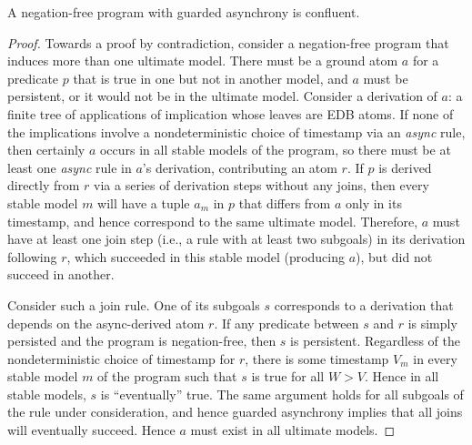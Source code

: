 \begin{lemma}
\label{lem:guarding}
A negation-free \lang program with guarded asynchrony is confluent.
\end{lemma}
\begin{proof}


Towards a proof by contradiction, consider a negation-free \lang program that 
induces more than one ultimate model.  There must be a ground atom $a$ for a predicate $p$
that is true in one but
not in another model, and $a$ must be persistent, or it would not be
in the ultimate model.  Consider a derivation of $a$: a finite tree of applications of
implication whose leaves are EDB atoms.  If none of the implications involve a nondeterministic
choice of timestamp via an {\em async} rule, then certainly 
$a$ occurs in all stable models of the program,
so there must be at least one {\em async} rule in $a$'s derivation, contributing an atom
$r$.  
If $p$ is derived directly from 
$r$ via a series of derivation steps without any joins, then every stable
model $m$ will have a tuple $a_m$ in $p$ that differs from $a$ only in its timestamp, 
and hence correspond to the same ultimate model.
Therefore, $a$ must have at least one join step (i.e., a rule with at least two subgoals)
in its derivation following $r$,
which succeeded in this stable model (producing $a$), but did not succeed in another.  

Consider such  a join rule.  One of its subgoals $s$ corresponds to a derivation that depends
on the async-derived atom $r$.  If any predicate between $s$ and $r$ is simply persisted and 
the program is negation-free,
then $s$ is persistent.  Regardless of the nondeterministic choice of timestamp for $r$, there
is some timestamp $V_m$ in every stable model $m$ of the program such that $s$ is true
for all $W > V$.  Hence in all stable models, $s$ is ``eventually'' true.  The same argument holds
for all subgoals of the rule under consideration, and hence guarded asynchrony implies that
all joins will eventually succeed.
Hence $a$ must exist in all ultimate models.

\end{proof}


